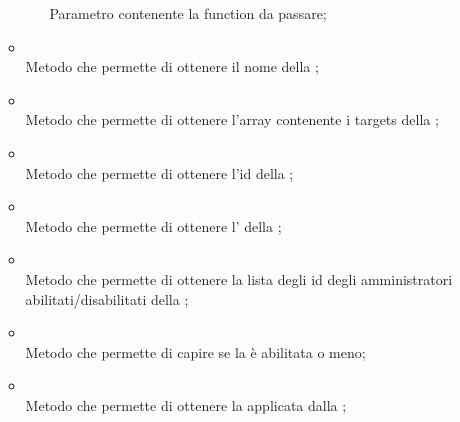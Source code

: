 \begin{itemize}
\begin{itemize}
\begin{itemize}
			Parametro contenente la function da passare;
		\end{itemize}
		\item[]  \\
		Metodo che permette di ottenere il nome della ;\\
		\item[]  \\
		Metodo che permette di ottenere l'array contenente i targets della ;\\
		\item[]  \\
		Metodo che permette di ottenere l'id della ;\\
		\item[]  \\
		Metodo che permette di ottenere l' della ;\\
		\item[]  \\
		Metodo che permette di ottenere la lista degli id degli amministratori abilitati/disabilitati della ;\\
		\item[]  \\
		Metodo che permette di capire se la  è abilitata o meno;\\
		\item[]  \\
		Metodo che permette di ottenere la  applicata dalla ;\\
	\end{itemize}
\end{itemize}


